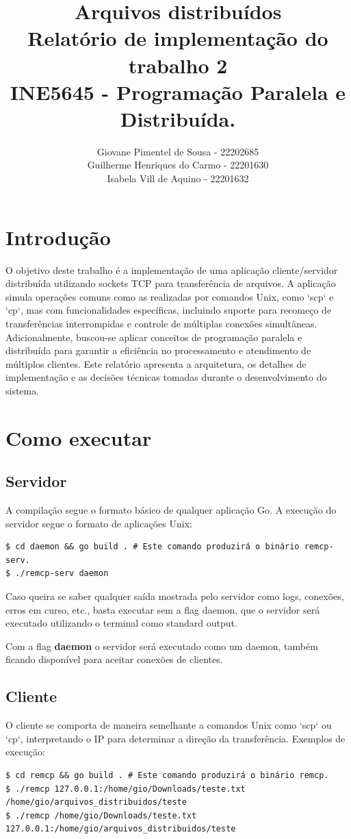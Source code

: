 \documentclass{article}
\title{
	Arquivos distribuídos\\
	\large Relatório de implementação do trabalho 2\\INE5645 - Programação Paralela e Distribuída.
}
\author{Giovane Pimentel de Sousa - 22202685\\
		Guilherme Henriques do Carmo - 22201630\\
		Isabela Vill de Aquino - 22201632
}
\begin{document}
\maketitle

\section*{Introdução}

O objetivo deste trabalho é a implementação de uma aplicação cliente/servidor distribuída utilizando sockets TCP para transferência de arquivos. A aplicação
simula operações comuns como as realizadas por comandos Unix, como `scp` e `cp`, mas com funcionalidades específicas, incluindo suporte para recomeço de
transferências interrompidas e controle de múltiplas conexões simultâneas. Adicionalmente, buscou-se aplicar conceitos de programação paralela e distribuída
para garantir a eficiência no processamento e atendimento de múltiplos clientes. Este relatório apresenta a arquitetura, os detalhes de implementação e as
decisões técnicas tomadas durante o desenvolvimento do sistema.

\section*{Como executar}

\subsection*{Servidor}
A compilação segue o formato básico de qualquer aplicação Go. A execução do servidor segue o formato de aplicações Unix:
\begin{lstlisting}
$ cd daemon && go build . # Este comando produzirá o binário remcp-serv.
$ ./remcp-serv daemon
\end{lstlisting}

Caso queira se saber qualquer saída mostrada pelo servidor como logs, conexões, erros em curso, etc., basta executar sem a flag daemon,
que o servidor será executado utilizando o terminal como standard output.

Com a flag \textbf{daemon} o servidor será executado como um daemon, também ficando disponível para aceitar conexões de clientes.

\subsection*{Cliente}
O cliente se comporta de maneira semelhante a comandos Unix como `scp` ou `cp`, interpretando o IP para determinar a direção da transferência. Exemplos de execução:
\begin{lstlisting}
$ cd remcp && go build . # Este comando produzirá o binário remcp.
$ ./remcp 127.0.0.1:/home/gio/Downloads/teste.txt /home/gio/arquivos_distribuidos/teste
$ ./remcp /home/gio/Downloads/teste.txt 127.0.0.1:/home/gio/arquivos_distribuidos/teste
\end{lstlisting}
\end{document}

